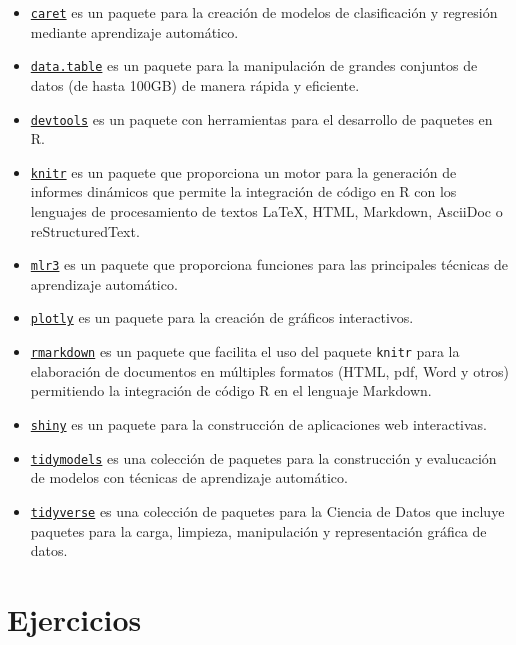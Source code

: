 \documentclass[
  spanish,
  a4paper,
]{scrreport}
\providecommand{\tightlist}{%
  \setlength{\itemsep}{0pt}\setlength{\parskip}{0pt}}
\theoremstyle{definition}
\theoremstyle{definition}
\theoremstyle{remark}
\begin{document}
\begin{itemize}
\tightlist
\item
  \href{https://topepo.github.io/caret/index.html}{\texttt{caret}} es un
  paquete para la creación de modelos de clasificación y regresión
  mediante aprendizaje automático.
\item
  \href{https://www.rdocumentation.org/packages/data.table/}{\texttt{data.table}}
  es un paquete para la manipulación de grandes conjuntos de datos (de
  hasta 100GB) de manera rápida y eficiente.
\item
  \href{https://www.rdocumentation.org/packages/devtools/}{\texttt{devtools}}
  es un paquete con herramientas para el desarrollo de paquetes en R.
\item
  \href{https://www.r-project.org/nosvn/pandoc/knitr.html}{\texttt{knitr}}
  es un paquete que proporciona un motor para la generación de informes
  dinámicos que permite la integración de código en R con los lenguajes
  de procesamiento de textos LaTeX, HTML, Markdown, AsciiDoc o
  reStructuredText.
\item
  \href{https://mlr3.mlr-org.com/}{\texttt{mlr3}} es un paquete que
  proporciona funciones para las principales técnicas de aprendizaje
  automático.
\item
  \href{https://plotly.com/r/}{\texttt{plotly}} es un paquete para la
  creación de gráficos interactivos.
\item
  \href{https://rmarkdown.rstudio.com/}{\texttt{rmarkdown}} es un
  paquete que facilita el uso del paquete \texttt{knitr} para la
  elaboración de documentos en múltiples formatos (HTML, pdf, Word y
  otros) permitiendo la integración de código R en el lenguaje Markdown.
\item
  \href{https://shiny.rstudio.com/}{\texttt{shiny}} es un paquete para
  la construcción de aplicaciones web interactivas.
\item
  \href{https://www.tidymodels.org/}{\texttt{tidymodels}} es una
  colección de paquetes para la construcción y evalucación de modelos
  con técnicas de aprendizaje automático.
\item
  \href{https://www.tidyverse.org/}{\texttt{tidyverse}} es una colección
  de paquetes para la Ciencia de Datos que incluye paquetes para la
  carga, limpieza, manipulación y representación gráfica de datos.
\end{itemize}

\section{Ejercicios}\label{ejercicios-3}
\end{document}
